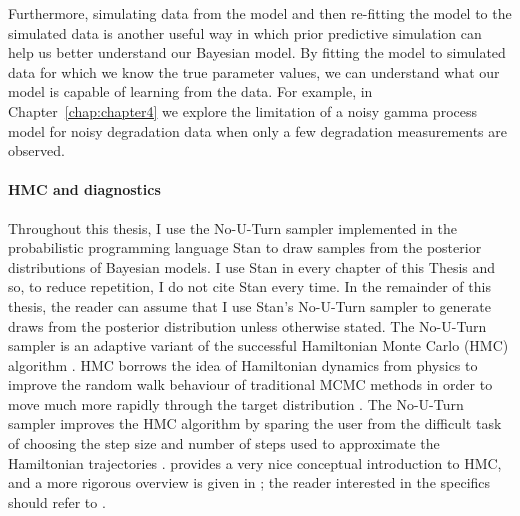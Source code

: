 Furthermore, simulating data from the model and then re-fitting the model to the simulated data is another useful way in which prior predictive simulation can help us better understand our Bayesian model. By fitting the model to simulated data for which we know the true parameter values, we can understand what our model is capable of learning from the data. For example, in Chapter~\ref{chap:chapter4} we explore the limitation of a noisy gamma process model for noisy degradation data when only a few degradation measurements are observed.

\paragraph*{HMC and diagnostics}

Throughout this thesis, I use the No-U-Turn sampler \citep{hoffman_2014} implemented in the probabilistic programming language Stan \citep{Stan2022} to draw samples from the posterior distributions of Bayesian models. I use Stan in every chapter of this Thesis and so, to reduce repetition, I do not cite Stan every time. In the remainder of this thesis, the reader can assume that I use Stan's No-U-Turn sampler to generate draws from the posterior distribution unless otherwise stated. The No-U-Turn sampler is an adaptive variant of the successful Hamiltonian Monte Carlo (HMC) algorithm \citep{neal2011}. HMC borrows the idea of Hamiltonian dynamics from physics to improve the random walk behaviour of traditional MCMC methods in order to move much more rapidly through the target distribution \citep{BDA2020}. The No-U-Turn sampler improves the HMC algorithm by sparing the user from the difficult task of choosing the step size and number of steps used to approximate the Hamiltonian trajectories \citep{hoffman_2014}. \citet{betancourt_2017} provides a very nice conceptual introduction to HMC, and a more rigorous overview is given in \citet[p.~300]{BDA2020}; the reader interested in the specifics should refer to \citet{betancourt_2015}.


